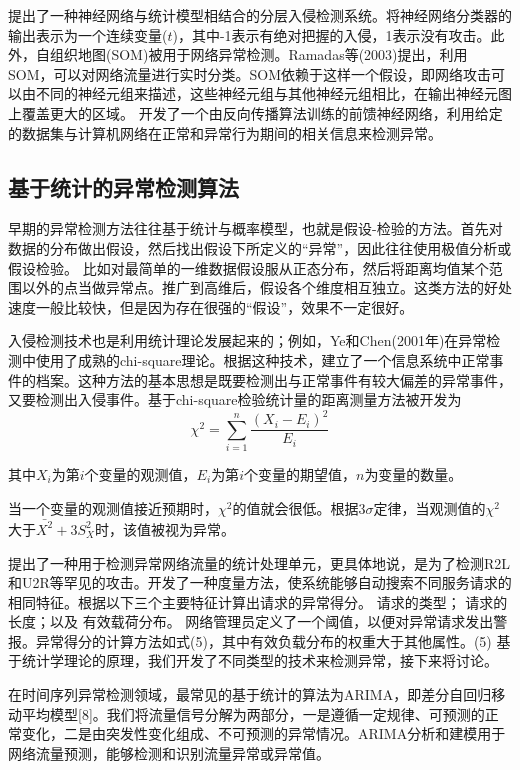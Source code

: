 \citet{2001HIDE} 提出了一种神经网络与统计模型相结合的分层入侵检测系统。将神经网络分类器的输出表示为一个连续变量($t$)，其中-1表示有绝对把握的入侵，1表示没有攻击。此外，自组织地图(SOM)被用于网络异常检测。Ramadas等(2003)提出，利用SOM，可以对网络流量进行实时分类。SOM依赖于这样一个假设，即网络攻击可以由不同的神经元组来描述，这些神经元组与其他神经元组相比，在输出神经元图上覆盖更大的区域。\citet{5592568} 开发了一个由反向传播算法训练的前馈神经网络，利用给定的数据集与计算机网络在正常和异常行为期间的相关信息来检测异常。

\subsection{基于统计的异常检测算法}

早期的异常检测方法往往基于统计与概率模型，也就是假设-检验的方法。首先对数据的分布做出假设，然后找出假设下所定义的“异常”，因此往往使用极值分析或假设检验。
比如对最简单的一维数据假设服从正态分布，然后将距离均值某个范围以外的点当做异常点。推广到高维后，假设各个维度相互独立。这类方法的好处速度一般比较快，但是因为存在很强的“假设”，效果不一定很好。

入侵检测技术也是利用统计理论发展起来的；例如，Ye和Chen(2001年)在异常检测中使用了成熟的chi-square理论。根据这种技术，建立了一个信息系统中正常事件的档案。这种方法的基本思想是既要检测出与正常事件有较大偏差的异常事件，又要检测出入侵事件。基于chi-square检验统计量的距离测量方法被开发为
\begin{equation}
    \chi^2 = \sum_{i=1}^n \frac{(X_i - E_i)^2}{E_i}
\end{equation}

其中$X_i$为第$i$个变量的观测值，$E_i$为第$i$个变量的期望值，$n$为变量的数量。

当一个变量的观测值接近预期时，$\chi^2$的值就会很低。根据$3\sigma$定律，当观测值的$\chi^2$大于$\bar{X^2}+3S_X^2$时，该值被视为异常。

\citet{Christopher2002Service} 提出了一种用于检测异常网络流量的统计处理单元，更具体地说，是为了检测R2L和U2R等罕见的攻击。开发了一种度量方法，使系统能够自动搜索不同服务请求的相同特征。根据以下三个主要特征计算出请求的异常得分。
请求的类型；
请求的长度；以及
有效载荷分布。
网络管理员定义了一个阈值，以便对异常请求发出警报。异常得分的计算方法如式(5)，其中有效负载分布的权重大于其他属性。(5)
基于统计学理论的原理，我们开发了不同类型的技术来检测异常，接下来将讨论。

在时间序列异常检测领域，最常见的基于统计的算法为ARIMA，即差分自回归移动平均模型[8]。我们将流量信号分解为两部分，一是遵循一定规律、可预测的正常变化，二是由突发性变化组成、不可预测的异常情况。ARIMA分析和建模用于网络流量预测，能够检测和识别流量异常或异常值。


